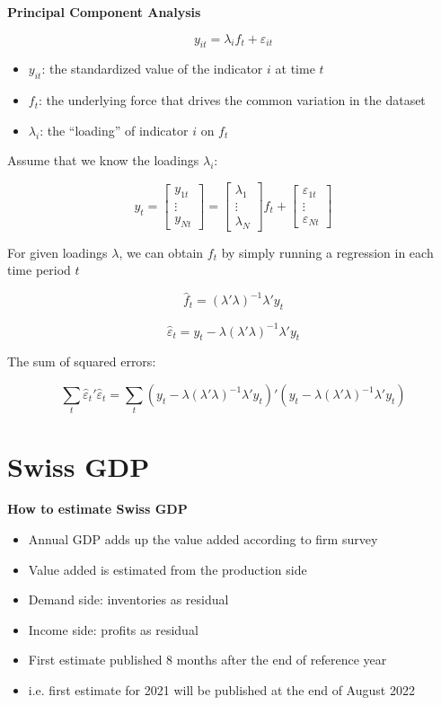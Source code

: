 \documentclass{article}
\begin{document}
\textbf{Principal Component Analysis}

\[y_{it}=\lambda_i f_t+\varepsilon_{it} \]

\begin{itemize}
    \item $y_{it}$: the standardized value of the indicator $i$ at time $t$
    \item $f_t$: the underlying force that drives the common variation in the dataset
    \item $\lambda_i$: the ``loading'' of indicator $i$ on $f_t$
\end{itemize}

Assume that we know the loadings $\lambda_i$:

\[y_t=
\begin{bmatrix}
    y_{1t} \\ \vdots \\ y_{Nt}
\end{bmatrix}=
\begin{bmatrix}
    \lambda_1 \\ \vdots \\ \lambda_N
\end{bmatrix}f_t + 
\begin{bmatrix}
    \varepsilon_{1t} \\ \vdots \\ \varepsilon_{Nt}
\end{bmatrix}
\]

For given loadings $\lambda$, we can obtain $f_t$ by simply running a regression in each time period $t$

\[\hat{f}_t=(\lambda'\lambda)^{-1}\lambda'y_t \]

\[\hat{\varepsilon}_t=y_t-\lambda(\lambda'\lambda)^{-1}\lambda'y_t \]

The sum of squared errors:

\[\sum_t\hat{\varepsilon}_t'\hat{\varepsilon}_t=
\sum_t\left(y_t-\lambda(\lambda'\lambda)^{-1}\lambda'y_t\right)'\left(y_t-\lambda(\lambda'\lambda)^{-1}\lambda'y_t\right)
\]

\section{Swiss GDP}

\textbf{How to estimate Swiss GDP}
\begin{itemize}
    \item Annual GDP adds up the value added according to firm survey
    \item Value added is estimated from the production side
    \item Demand side: inventories as residual
    \item Income side: profits as residual
    \item First estimate published 8 months after the end of reference year
    \item i.e. first estimate for 2021 will be published at the end of August 2022
\end{itemize}
\end{document}
